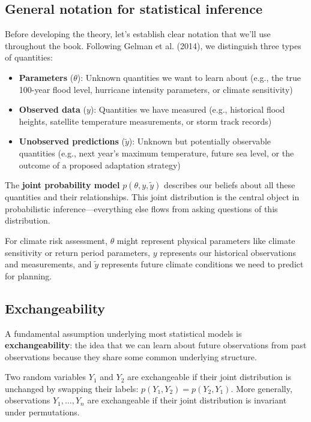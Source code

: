 \documentclass[
  letterpaper,
  DIV=11,
  numbers=noendperiod]{scrreprt}
\providecommand{\tightlist}{%
  \setlength{\itemsep}{0pt}\setlength{\parskip}{0pt}}
\begin{document}
\subsection{General notation for statistical
inference}\label{general-notation-for-statistical-inference}

Before developing the theory, let's establish clear notation that we'll
use throughout the book. Following Gelman et al. (2014), we distinguish
three types of quantities:

\begin{itemize}
\tightlist
\item
  \textbf{Parameters} (\(\theta\)): Unknown quantities we want to learn
  about (e.g., the true 100-year flood level, hurricane intensity
  parameters, or climate sensitivity)
\item
  \textbf{Observed data} (\(y\)): Quantities we have measured (e.g.,
  historical flood heights, satellite temperature measurements, or storm
  track records)
\item
  \textbf{Unobserved predictions} (\(\tilde{y}\)): Unknown but
  potentially observable quantities (e.g., next year's maximum
  temperature, future sea level, or the outcome of a proposed adaptation
  strategy)
\end{itemize}

The \textbf{joint probability model} \(p(\theta, y, \tilde{y})\)
describes our beliefs about all these quantities and their
relationships. This joint distribution is the central object in
probabilistic inference---everything else flows from asking questions of
this distribution.

For climate risk assessment, \(\theta\) might represent physical
parameters like climate sensitivity or return period parameters, \(y\)
represents our historical observations and measurements, and
\(\tilde{y}\) represents future climate conditions we need to predict
for planning.

\subsection{Exchangeability}\label{exchangeability}

A fundamental assumption underlying most statistical models is
\textbf{exchangeability}: the idea that we can learn about future
observations from past observations because they share some common
underlying structure.

Two random variables \(Y_1\) and \(Y_2\) are exchangeable if their joint
distribution is unchanged by swapping their labels:
\(p(Y_1, Y_2) = p(Y_2, Y_1)\). More generally, observations
\(Y_1, \ldots, Y_n\) are exchangeable if their joint distribution is
invariant under permutations.
\end{document}
